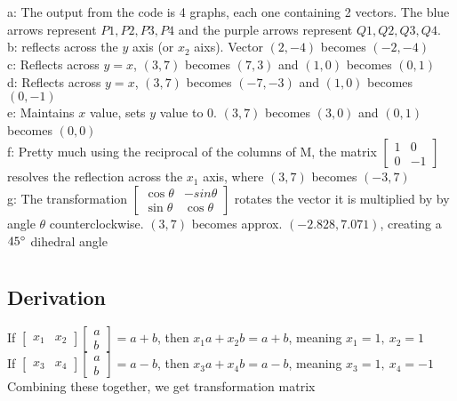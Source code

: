 \documentclass{article}
\begin{document}
\section{}
a: The output from the code is 4 graphs, each one containing 2 vectors. The blue arrows represent $P1, P2, P3, P4$ and the purple arrows represent $Q1,Q2,Q3,Q4$. 
\\[0.05in]b: reflects across the $y$ axis (or $x_2$ aixs). Vector $(2,-4)$ becomes $(-2,-4)$
\\[0.05in]c: Reflects across $y=x$, $(3,7)$ becomes $(7,3)$ and $(1,0)$ becomes $(0,1)$
\\[0.05in]d: Reflects across $y=x$, $(3,7)$ becomes $(-7,-3)$ and $(1,0)$ becomes $(0,-1)$
\\[0.05in]e: Maintains $x$ value, sets $y$ value to $0$. $(3,7)$ becomes $(3,0)$ and $(0,1)$ becomes $(0,0)$
\\[0.05in]f: Pretty much using the reciprocal of the columns of M, the matrix $\begin{bmatrix}1&0\\0&-1\end{bmatrix}$ resolves the reflection across the $x_1$ axis, where $(3,7)$ becomes $(-3,7)$
\\[0.05in]g: The transformation $\begin{bmatrix}\cos\theta&-sin\theta\\\sin\theta&\cos\theta\end{bmatrix}$ rotates the vector it is multiplied by by angle $\theta$ counterclockwise. $(3,7)$ becomes approx. $(-2.828, 7.071)$, creating a $45\degree$ dihedral angle
\pagebreak
\section{}
\subsection{Derivation}
If $\begin{bmatrix}x_1&x_2\end{bmatrix}\begin{bmatrix}a\\b\end{bmatrix} = a+b$, then $x_1a+x_2b=a+b$, meaning $x_1=1,~x_2=1$
\\[0.05in]If $\begin{bmatrix}x_3&x_4\end{bmatrix}\begin{bmatrix}a\\b\end{bmatrix} = a-b$, then $x_3a+x_4b=a-b$, meaning $x_3=1,~x_4=-1$
\\Combining these together, we get transformation matrix 
\end{document}
